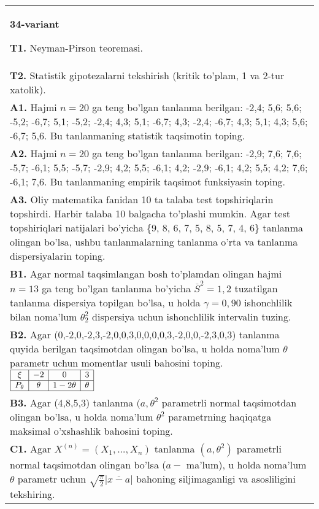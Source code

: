 \documentclass{article}
\begin{document}
\begin{tabular}{m{17cm}}
\textbf{34-variant}
\newline

\textbf{T1.} 
Neyman-Pirson teoremasi.
\\
\textbf{T2.} 
Statistik gipotezalarni tekshirish (kritik to'plam, 1 va 2-tur xatolik).
\\
\textbf{A1.} 
Hajmi \(n = 20\) ga teng bo'lgan tanlanma berilgan: -2,4; 5,6; 5,6; -5,2; -6,7; 5,1; -5,2; -2,4; 4,3; 5,1; -6,7; 4,3; -2,4; -6,7; 4,3; 5,1; 4,3; 5,6; -6,7; 5,6. Bu tanlanmaning statistik taqsimotin toping.
\\
\textbf{A2.} 
Hajmi \(n = 20\) ga teng bo'lgan tanlanma berilgan: -2,9; 7,6; 7,6; -5,7; -6,1; 5,5; -5,7; -2,9; 4,2; 5,5; -6,1; 4,2; -2,9; -6,1; 4,2; 5,5; 4,2; 7,6; -6,1; 7,6. Bu tanlanmaning empirik taqsimot funksiyasin toping.
\\
\textbf{A3.} 
Oliy matematika fanidan 10 ta talaba test topshiriqlarin topshirdi. Harbir talaba 10 balgacha to'plashi mumkin. Agar test topshiriqlari natijalari bo'yicha \{9, 8, 6, 7, 5, 8, 5, 7, 4, 6\} tanlanma olingan bo'lsa, ushbu tanlanmalarning tanlanma o'rta va tanlanma dispersiyalarin toping.
\\
\textbf{B1.} 
Agar normal taqsimlangan bosh to'plamdan olingan hajmi \(n = 13\) ga teng bo'lgan tanlanma bo'yicha \({\overline{S}}^{2} = 1,2\) tuzatilgan tanlanma dispersiya topilgan bo'lsa, u holda \(\gamma = 0,90\) ishonchlilik bilan noma'lum \(\theta_{2}^{2}\) dispersiya uchun ishonchlilik intervalin tuzing.
\\
\textbf{B2.} 
Agar (0,-2,0,-2,3,-2,0,0,3,0,0,0,0,3,-2,0,0,-2,3,0,3) tanlanma quyida berilgan taqsimotdan olingan bo'lsa, u holda noma'lum \(\theta\) parametr uchun momentlar usuli bahosini toping.
$\begin{array}{|c|c|c|c|}
    \hline
    \xi & - 2 & 0 & 3 \\
    \hline
    P_{\theta} & \theta & 1 - 2\theta & \theta \\
    \hline
\end{array}$
\\
\textbf{B3.} 
Agar (4,8,5,3) tanlanma \((a,\theta^{2}\) parametrli normal taqsimotdan olingan bo'lsa, u holda noma'lum \(\theta^{2}\) parametrning haqiqatga maksimal o'xshashlik bahosini toping.
\\
\textbf{C1.} 
Agar \(X^{(n)} = \left( X_{1},...,X_{n} \right)\) tanlanma \(\left( a,\theta^{2} \right)\) parametrli normal taqsimotdan olingan bo'lsa (\(a -\) ma'lum), u holda noma'lum \(\theta\) parametr uchun \(\sqrt{\frac{\pi}{2}}\left| \overline{x - a} \right|\) bahoning siljimaganligi va asosliligini tekshiring.

\end{tabular}
\end{document}

